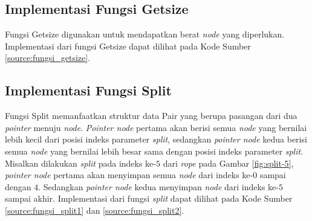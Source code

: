 

\subsection{Implementasi Fungsi Getsize}
Fungsi Getsize digunakan untuk mendapatkan berat \textit{node} yang diperlukan. Implementasi dari fungsi Getsize dapat dilihat pada Kode Sumber \ref{source:fungsi_getsize}.



\subsection{Implementasi Fungsi Split}
Fungsi Split memanfaatkan struktur data Pair yang berupa pasangan dari dua \textit{pointer} menuju \textit{node}. \textit{Pointer node} pertama akan berisi semua \textit{node} yang bernilai lebih kecil dari posisi indeks parameter \textit{split}, sedangkan \textit{pointer node} kedua berisi semua \textit{node} yang bernilai lebih besar sama dengan posisi indeks parameter \textit{split}.\\
Misalkan dilakukan \textit{split} pada indeks ke-$5$ dari \textit{rope} pada Gambar \ref{fig:split-5}, \textit{pointer node} pertama akan menyimpan semua \textit{node} dari indeks ke-$0$ sampai dengan $4$. Sedangkan \textit{pointer node} kedua menyimpan \textit{node} dari indeks ke-$5$ sampai akhir. Implementasi dari fungsi \textit{split} dapat dilihat pada Kode Sumber \ref{source:fungsi_split1} dan \ref{source:fungsi_split2}.
